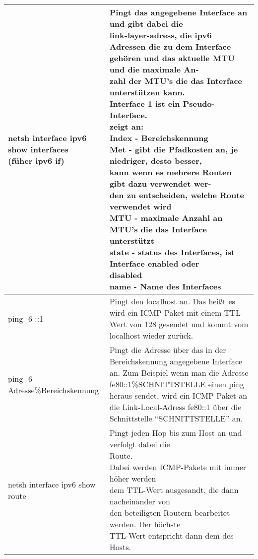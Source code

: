 \renewcommand{\tabcolsep}{1pt}
\begin{longtable}[width=\textwidth]{@{}p{}@{\hspace{3em}}p{}@{}}
    \hline
    \makecell[l]{netsh interface ipv6 show interfaces \\ (füher ipv6 if)}
        &
    \makecell[l]{
        Pingt das angegebene Interface an und gibt dabei die \\link-layer-adress, die ipv6 Adressen die zu dem Interface \\gehören und das aktuelle MTU und die maximale An-\\zahl der MTU’s die das Interface unterstützen kann.\\
        Interface 1 ist ein Pseudo-Interface.\\
        zeigt an:\\
            \textbf{Index} - Bereichskennung \\
            \textbf{Met} - gibt die Pfadkosten an, je niedriger, desto besser, \\kann wenn es mehrere Routen gibt dazu verwendet wer-\\den zu entscheiden, welche Route verwendet wird\\
            \textbf{MTU} - maximale Anzahl an MTU’s die das Interface \\unterstützt\\
            \textbf{state} - status des Interfaces, ist Interface enabled oder\\ disabled\\
            \textbf{name} - Name des Interfaces
    }
    \\\hline
    ping -6 ::1
    &
    Pingt den localhost an. Das heißt es wird ein ICMP-Paket mit einem TTL Wert von 128 gesendet und kommt vom localhost wieder zurück.
    \\\hline
    ping -6 Adresse\%Bereichskennung
    &
    Pingt die Adresse über das in der Bereichskennung angegebene Interface an. Zum Beispiel wenn man die Adresse fe80::1\%SCHNITTSTELLE einen ping heraus sendet, wird ein ICMP Paket an die Link-Local-Adress fe80::1 über die Schnittstelle “SCHNITTSTELLE” an.
    \\\hline
    netsh interface ipv6 show route
    &
    \makecell[l]{
        Pingt jeden Hop bis zum Host an und verfolgt dabei die \\Route.\\
        Dabei werden ICMP-Pakete mit immer höher werden \\dem TTL-Wert ausgesandt, die dann nacheinander von\\ den beteiligten Routern bearbeitet werden. Der höchste \\TTL-Wert entspricht dann dem des Hosts.\\
}
\end{longtable}
